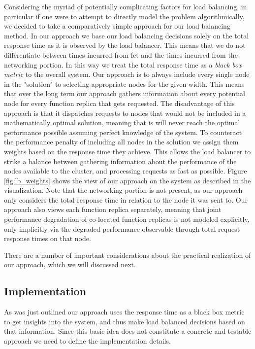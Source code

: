 \documentclass[draft,final]{vutinfth} %
\begin{document}
Considering the myriad of potentially complicating factors for load balancing, in particular if one were to attempt to directly model the problem algorithmically, we decided to take a comparatively simple approach for our load balancing method.
In our approach we base our load balancing decisions solely on the total response time as it is observed by the load balancer. This means that we do not differentiate between times incurred from \gls{fet} and the times incurred from the networking portion. In this way we treat the total response time as a \textit{black box metric} to the overall system.
Our approach is to always include every single node in the "solution" to selecting appropriate nodes for the given width. This means that over the long term our approach gathers information about every potential node for every function replica that gets requested.
The disadvantage of this approach is that it dispatches requests to nodes that would not be included in a mathematically optimal solution, meaning that is will never reach the optimal performance possible assuming perfect knowledge of the system.
To counteract the performance penalty of including all nodes in the solution we assign them weights based on the response time they achieve.
This allows the load balancer to strike a balance between gathering information about the performance of the nodes available to the cluster, and processing requests as fast as possible.
Figure \ref{fig:lb_weights} shows the view of our approach on the system as described in the visualization. Note that the networking portion is not present, as our approach only considers the total response time in relation to the node it was sent to. Our approach also views each function replica separately, meaning that joint performance degradation of co-located function replicas is not modeled explicitly, only implicitly via the degraded performance observable through total request response times on that node.

There are a number of important considerations about the practical realization of our approach, which we will discussed next.


\subsection{Implementation}
As was just outlined our approach uses the response time as a black box metric to get insights into the system, and thus make load balanced decisions based on that information.
Since this basic idea does not constitute a concrete and testable approach we need to define the implementation details.
\end{document}
